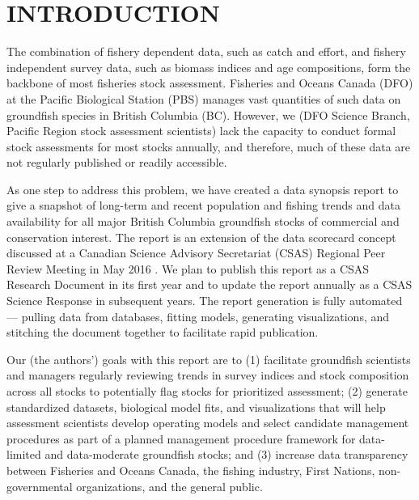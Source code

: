 \documentclass[11pt]{book}\usepackage[]{graphicx}\usepackage[]{color}
\begin{document}


\frontmatter



\section{INTRODUCTION} \label{sec:introduction}


The combination of fishery dependent data, such as catch and effort, and fishery
independent survey data, such as biomass indices and age compositions, form the
backbone of most fisheries stock assessment. Fisheries and Oceans Canada (DFO)
at the Pacific Biological Station (PBS) manages vast quantities of such data on
groundfish species in British Columbia (BC). However, we (DFO Science Branch, Pacific
Region stock assessment scientists) lack the capacity to conduct formal stock
assessments for most stocks annually, and therefore, much of these data are not
regularly published or readily accessible.

As one step to address this problem, we have created a data synopsis report to
give a snapshot of long-term and recent population and fishing trends and data
availability for all major British Columbia groundfish stocks of commercial and
conservation interest. The report is an extension of the data scorecard concept
discussed at a Canadian Science Advisory Secretariat (CSAS) Regional Peer Review
Meeting in May 2016 \citep{macdougall2016}. We plan to publish this report as
a CSAS Research Document in its first year and to update the report annually as
a CSAS Science Response in subsequent years. The report generation is fully
automated --- pulling data from databases, fitting models, generating
visualizations, and stitching the document together to facilitate rapid
publication.

Our (the authors') goals with this report are to (1) facilitate groundfish
scientists and managers regularly reviewing trends in survey indices and stock
composition across all stocks to potentially flag stocks for prioritized
assessment; (2) generate standardized datasets, biological model fits, and
visualizations that will help assessment scientists develop operating models and
select candidate management procedures as part of a planned management procedure
framework for data-limited and data-moderate groundfish stocks; and (3) increase
data transparency between Fisheries and Oceans Canada, the fishing industry,
First Nations, non-governmental organizations, and the general public.
\end{document}
